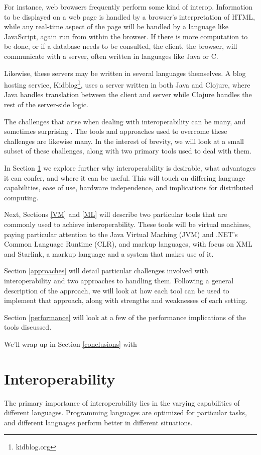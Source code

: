 \documentclass{sig-alternate}
\begin{document}
For instance, web browsers frequently perform some kind of interop. Information to be displayed on a web page is handled by a browser's interpretation of HTML, while any real-time aspect of the page will be handled by a language like JavaScript, again run from within the browser. If there is more computation to be done, or if a database needs to be consulted, the client, the browser, will communicate with a server, often written in languages like Java or C.

Likewise, these servers may be written in several languages themselves. A blog hosting service, Kidblog\footnote{kidblog.org}, uses a server written in both Java and Clojure, where Java handles translation between the client and server while Clojure handles the rest of the server-side logic.

The challenges that arise when dealing with interoperability can be many, and sometimes surprising \cite{Chisnall:2013}. The tools and approaches used to overcome these challenges are likewise many. In the interest of brevity, we will look at a small subset of these challenges, along with two primary tools used to deal with them.

In Section \ref{Interop} we explore further why interoperability is desirable, what advantages it can confer, and where it can be useful. This will touch on differing language capabilities, ease of use, hardware independence, and implications for distributed computing.

Next, Sections \ref{VM} and \ref{ML} will describe two particular tools that are commonly used to achieve interoperability. These tools will be virtual machines, paying particular attention to the Java Virtual Maching (JVM) and .NET's Common Language Runtime (CLR), and markup languages, with focus on XML and Starlink, a markup language and a system that makes use of it.

Section \ref{approaches} will detail particular challenges involved with interoperability and two approaches to handling them. Following a general description of the approach, we will look at how each tool can be used to implement that approach, along with strengths and weaknesses of each setting.

Section \ref{performance} will look at a few of the performance implications of the tools discussed.

We'll wrap up in Section \ref{conclusions} with

\section{Interoperability}\label{Interop}
The primary importance of interoperability lies in the varying capabilities of different languages. Programming languages are optimized for particular tasks, and different languages perform better in different situations.
\end{document}
